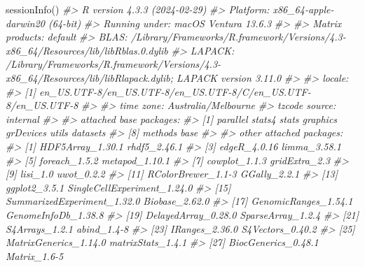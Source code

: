 \documentclass[]{article}
\newcommand{\hlcom}[1]{\textcolor[rgb]{0.502,0.502,0.502}{\textit{#1}}}%
\newcommand{\hlstd}[1]{\textcolor[rgb]{0.251,0.251,0.251}{#1}}%
\newenvironment{Shaded}{\begin{myshaded}}{\end{myshaded}}
\newcommand{\CommentTok}[1]{\hlcom{#1}}
\newcommand{\FunctionTok}[1]{\hlstd{#1}}
\newcommand{\NormalTok}[1]{\hlstd{#1}}
\begin{document}
\begin{Shaded}
\begin{Highlighting}[]
\FunctionTok{sessionInfo}\NormalTok{()}
\CommentTok{\#\textgreater{} R version 4.3.3 (2024{-}02{-}29)}
\CommentTok{\#\textgreater{} Platform: x86\_64{-}apple{-}darwin20 (64{-}bit)}
\CommentTok{\#\textgreater{} Running under: macOS Ventura 13.6.3}
\CommentTok{\#\textgreater{} }
\CommentTok{\#\textgreater{} Matrix products: default}
\CommentTok{\#\textgreater{} BLAS:   /Library/Frameworks/R.framework/Versions/4.3{-}x86\_64/Resources/lib/libRblas.0.dylib }
\CommentTok{\#\textgreater{} LAPACK: /Library/Frameworks/R.framework/Versions/4.3{-}x86\_64/Resources/lib/libRlapack.dylib;  LAPACK version 3.11.0}
\CommentTok{\#\textgreater{} }
\CommentTok{\#\textgreater{} locale:}
\CommentTok{\#\textgreater{} [1] en\_US.UTF{-}8/en\_US.UTF{-}8/en\_US.UTF{-}8/C/en\_US.UTF{-}8/en\_US.UTF{-}8}
\CommentTok{\#\textgreater{} }
\CommentTok{\#\textgreater{} time zone: Australia/Melbourne}
\CommentTok{\#\textgreater{} tzcode source: internal}
\CommentTok{\#\textgreater{} }
\CommentTok{\#\textgreater{} attached base packages:}
\CommentTok{\#\textgreater{} [1] parallel  stats4    stats     graphics  grDevices utils     datasets }
\CommentTok{\#\textgreater{} [8] methods   base     }
\CommentTok{\#\textgreater{} }
\CommentTok{\#\textgreater{} other attached packages:}
\CommentTok{\#\textgreater{}  [1] HDF5Array\_1.30.1            rhdf5\_2.46.1               }
\CommentTok{\#\textgreater{}  [3] edgeR\_4.0.16                limma\_3.58.1               }
\CommentTok{\#\textgreater{}  [5] foreach\_1.5.2               metapod\_1.10.1             }
\CommentTok{\#\textgreater{}  [7] cowplot\_1.1.3               gridExtra\_2.3              }
\CommentTok{\#\textgreater{}  [9] lisi\_1.0                    uwot\_0.2.2                 }
\CommentTok{\#\textgreater{} [11] RColorBrewer\_1.1{-}3          GGally\_2.2.1               }
\CommentTok{\#\textgreater{} [13] ggplot2\_3.5.1               SingleCellExperiment\_1.24.0}
\CommentTok{\#\textgreater{} [15] SummarizedExperiment\_1.32.0 Biobase\_2.62.0             }
\CommentTok{\#\textgreater{} [17] GenomicRanges\_1.54.1        GenomeInfoDb\_1.38.8        }
\CommentTok{\#\textgreater{} [19] DelayedArray\_0.28.0         SparseArray\_1.2.4          }
\CommentTok{\#\textgreater{} [21] S4Arrays\_1.2.1              abind\_1.4{-}8                }
\CommentTok{\#\textgreater{} [23] IRanges\_2.36.0              S4Vectors\_0.40.2           }
\CommentTok{\#\textgreater{} [25] MatrixGenerics\_1.14.0       matrixStats\_1.4.1          }
\CommentTok{\#\textgreater{} [27] BiocGenerics\_0.48.1         Matrix\_1.6{-}5               }

\end{Highlighting}
\end{Shaded}
\end{document}
